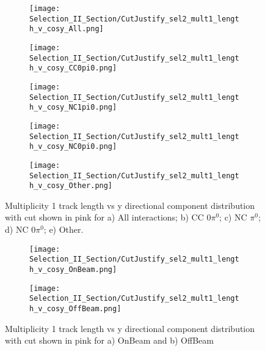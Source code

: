 \begin{figure}[H]
\centering
    \begin{subfigure}[t]{0.36\textwidth}
    \centering
    \texttt{[image: Selection\_II\_Section/CutJustify\_sel2\_mult1\_length\_v\_cosy\_All.png]}
	\caption{ }
  \end{subfigure} 
  \hspace{10mm}
  \begin{subfigure}[t]{0.36\textwidth}
    \centering
\texttt{[image: Selection\_II\_Section/CutJustify\_sel2\_mult1\_length\_v\_cosy\_CC0pi0.png]}
    \caption{ }
  \end{subfigure} 
  \hspace{3mm}
  \begin{subfigure}[t]{0.36\textwidth}
    \centering
\texttt{[image: Selection\_II\_Section/CutJustify\_sel2\_mult1\_length\_v\_cosy\_NC1pi0.png]}
    \caption{ }
  \end{subfigure} 
  \hspace{10mm}
  \begin{subfigure}[t]{0.36\textwidth}
    \centering
\texttt{[image: Selection\_II\_Section/CutJustify\_sel2\_mult1\_length\_v\_cosy\_NC0pi0.png]}
    \caption{ }
  \end{subfigure} 
  \hspace{3mm}
  \begin{subfigure}[t]{0.36\textwidth}
    \centering
\texttt{[image: Selection\_II\_Section/CutJustify\_sel2\_mult1\_length\_v\_cosy\_Other.png]}
    \caption{ }
  \end{subfigure} 
\caption{Multiplicity 1 track length vs y directional component distribution with cut shown in pink for a) All interactions; b) CC 0$\pi^0$; c) NC $\pi^0$; d) NC 0$\pi^0$; e) Other. }
\label{fig:cutjust_sel2_mult1_len_v_cosy}
\end{figure}


\begin{figure}[h!]
\centering
  \begin{subfigure}[t]{0.36\textwidth}
    \centering
\texttt{[image: Selection\_II\_Section/CutJustify\_sel2\_mult1\_length\_v\_cosy\_OnBeam.png]}
    \caption{ }
  \end{subfigure} 
  \hspace{10mm}
  \begin{subfigure}[t]{0.36\textwidth}
    \centering
    \texttt{[image: Selection\_II\_Section/CutJustify\_sel2\_mult1\_length\_v\_cosy\_OffBeam.png]}
    \caption{ }
  \end{subfigure} 
\caption{Multiplicity 1 track length vs y directional component distribution with cut shown in pink for a) OnBeam and b) OffBeam }
\label{fig:cutjust_sel2_onbeam_mult1_len_v_cosy}
\end{figure}

